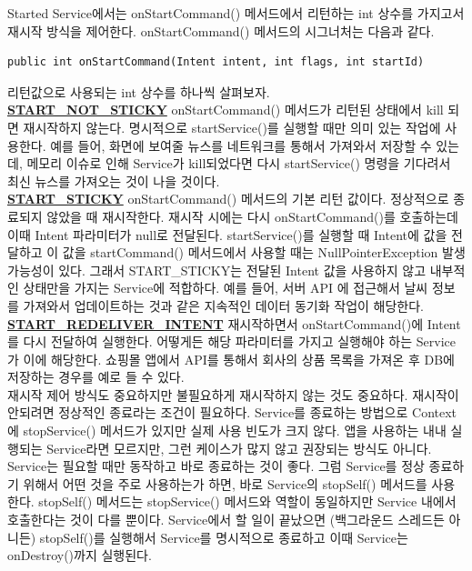 Started Service에서는 onStartCommand() 메서드에서 리턴하는 int 상수를 가지고서 재시작 방식을 제어한다. onStartCommand() 메서드의 시그너처는 다음과 같다.
\begin{lstlisting}[frame=single]
public int onStartCommand(Intent intent, int flags, int startId)
\end{lstlisting}

리턴값으로 사용되는 int 상수를 하나씩 살펴보자.\\
\underline{\bfseries START\_NOT\_STICKY} onStartCommand() 메서드가 리턴된 상태에서 kill 되면 재시작하지 않는다. 명시적으로 startService()를 실행할 때만 의미 있는 작업에 사용한다.
예를 들어, 화면에 보여줄 뉴스를 네트워크를 통해서 가져와서 저장할 수 있는데, 메모리 이슈로 인해 Service가 kill되었다면 다시 startService() 명령을 기다려서 최신 뉴스를 가져오는 것이 나을 것이다.\\

\underline{\bfseries START\_STICKY} onStartCommand() 메서드의 기본 리턴 값이다. 정상적으로 종료되지 않았을 때 재시작한다. 
재시작 시에는 다시 onStartCommand()를 호출하는데 이때 Intent 파라미터가 null로 전달된다.
startService()를 실행할 때 Intent에 값을 전달하고 이 값을 startCommand() 메서드에서 사용할 때는 NullPointerException 발생 가능성이 있다. 
그래서 START\_STICKY는 전달된 Intent 값을 사용하지 않고 내부적인 상태만을 가지는 Service에 적합하다.
예를 들어, 서버 API 에 접근해서 날씨 정보를 가져와서 업데이트하는 것과 같은 지속적인 데이터 동기화 작업이 해당한다.\\

\underline{\bfseries START\_REDELIVER\_INTENT} 재시작하면서 onStartCommand()에 Intent를 다시 전달하여 실행한다. 어떻게든 해당 파라미터를 가지고 실행해야 하는 Service가 이에 해당한다. 쇼핑몰 앱에서 API를 통해서 회사의 상품 목록을 가져온 후 DB에 저장하는 경우를 예로 들 수 있다.\\

재시작 제어 방식도 중요하지만 불필요하게 재시작하지 않는 것도 중요하다. 
재시작이 안되려면 정상적인 종료라는 조건이 필요하다. 
Service를 종료하는 방법으로 Context에 stopService() 메서드가 있지만 실제 사용 빈도가 크지 않다. 
앱을 사용하는 내내 실행되는 Service라면 모르지만, 그런 케이스가 많지 않고 권장되는 방식도 아니다. 
Service는 필요할 때만 동작하고 바로 종료하는 것이 좋다.
그럼 Service를 정상 종료하기 위해서 어떤 것을 주로 사용하는가 하면, 바로 Service의 stopSelf() 메서드를 사용한다. 
stopSelf() 메서드는 stopService() 메서드와 역할이 동일하지만 Service 내에서 호출한다는 것이 다를 뿐이다. Service에서 할 일이 끝났으면 (백그라운드 스레드든 아니든) stopSelf()를 실행해서 Service를 명시적으로 종료하고 이때 Service는 onDestroy()까지 실행된다.\\

